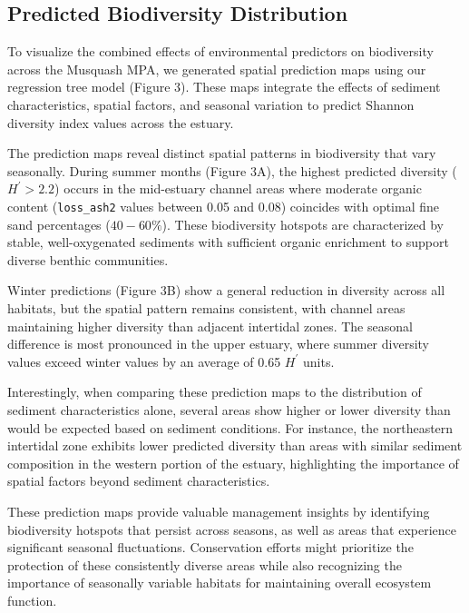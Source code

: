 \documentclass[12pt]{article}
\begin{document}
\subsection{Predicted Biodiversity Distribution}

\qquad To visualize the combined effects of environmental predictors on biodiversity across the Musquash MPA, we generated spatial prediction maps using our regression tree model (Figure 3). These maps integrate the effects of sediment characteristics, spatial factors, and seasonal variation to predict Shannon diversity index values across the estuary.


\qquad The prediction maps reveal distinct spatial patterns in biodiversity that vary seasonally. During summer months (Figure 3A), the highest predicted diversity ($H^{\prime} > 2.2$) occurs in the mid-estuary channel areas where moderate organic content (\texttt{loss\_ash2} values between 0.05 and 0.08) coincides with optimal fine sand percentages ($40-60\%$). These biodiversity hotspots are characterized by stable, well-oxygenated sediments with sufficient organic enrichment to support diverse benthic communities.

\qquad Winter predictions (Figure 3B) show a general reduction in diversity across all habitats, but the spatial pattern remains consistent, with channel areas maintaining higher diversity than adjacent intertidal zones. The seasonal difference is most pronounced in the upper estuary, where summer diversity values exceed winter values by an average of 0.65 $H^{\prime}$ units.

\qquad Interestingly, when comparing these prediction maps to the distribution of sediment characteristics alone, several areas show higher or lower diversity than would be expected based on sediment conditions. For instance, the northeastern intertidal zone exhibits lower predicted diversity than areas with similar sediment composition in the western portion of the estuary, highlighting the importance of spatial factors beyond sediment characteristics.

\qquad These prediction maps provide valuable management insights by identifying biodiversity hotspots that persist across seasons, as well as areas that experience significant seasonal fluctuations. Conservation efforts might prioritize the protection of these consistently diverse areas while also recognizing the importance of seasonally variable habitats for maintaining overall ecosystem function.
\end{document}
